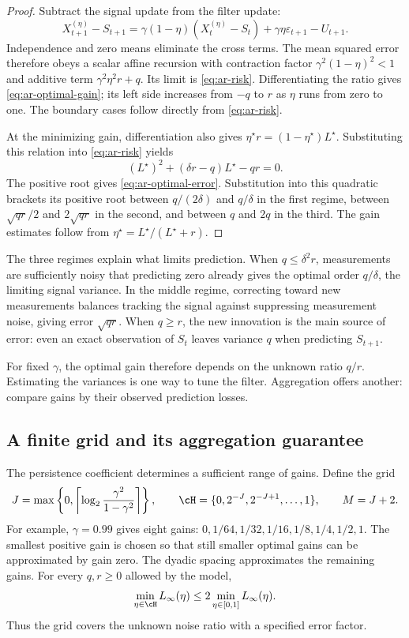 \documentclass[11pt,twoside]{article}
\theoremstyle{definition}
\theoremstyle{remark}
\begin{document}
\begin{proof}
Subtract the signal update from the filter update:
\[
 X_{t+1}^{(\eta)}-S_{t+1}
 =\gamma(1-\eta)(X_t^{(\eta)}-S_t)
   +\gamma\eta\varepsilon_{t+1}-U_{t+1}.
\]
Independence and zero means eliminate the cross terms. The mean squared
error therefore obeys a scalar affine recursion with contraction factor
$\gamma^2(1-\eta)^2<1$ and additive term $\gamma^2\eta^2r+q$.
Its limit is \cref{eq:ar-risk}. Differentiating the ratio gives
\cref{eq:ar-optimal-gain}; its left side increases from $-q$ to $r$
as $\eta$ runs from zero to one. The boundary cases follow directly
from \cref{eq:ar-risk}.

At the minimizing gain, differentiation also gives
$\eta^\star r=(1-\eta^\star)L^\star$. Substituting this relation into
\cref{eq:ar-risk} yields
\[
 (L^\star)^2+(\delta r-q)L^\star-qr=0.
\]
The positive root gives \cref{eq:ar-optimal-error}. Substitution into this
quadratic brackets its positive root between $q/(2\delta)$ and
$q/\delta$ in the first regime, between $\sqrt{qr}/2$ and
$2\sqrt{qr}$ in the second, and between $q$ and $2q$ in the third.
The gain estimates follow from $\eta^\star=L^\star/(L^\star+r)$.
\end{proof}

The three regimes explain what limits prediction. When
$q\le\delta^2r$, measurements are sufficiently noisy that predicting zero
already gives the optimal order $q/\delta$, the limiting signal variance.
In the middle regime, correcting toward new measurements balances tracking
the signal against suppressing measurement noise, giving error
$\sqrt{qr}$. When $q\ge r$, the new innovation is the main source of error:
even an exact observation of $S_t$ leaves variance $q$ when predicting
$S_{t+1}$.

For fixed $\gamma$, the optimal gain therefore depends on the unknown
ratio $q/r$. Estimating the variances is one way to tune the filter.
Aggregation offers another: compare gains by their observed prediction
losses.

\subsection{A finite grid and its aggregation guarantee}

The persistence coefficient determines a sufficient range of gains.
Define the grid
\begin{equation}
 J=\max\left\{0,\left\lceil\log_2\frac{\gamma^2}{1-\gamma^2}
                         \right\rceil\right\},\qquad
 \cH=\{0,2^{-J},2^{-J+1},\ldots,1\},\qquad M=J+2.
 \label{eq:gain-grid}
\end{equation}
For example, $\gamma=0.99$ gives eight gains:
$0,1/64,1/32,1/16,1/8,1/4,1/2,1$.
The smallest positive gain is chosen so that still smaller optimal gains
can be approximated by gain zero. The dyadic spacing approximates the
remaining gains. For every $q,r\ge0$ allowed by the model,
\begin{equation}
 \min_{\eta\in\cH}L_\infty(\eta)
 \le2\min_{\eta\in[0,1]}L_\infty(\eta).
 \label{eq:gain-grid-comparison}
\end{equation}
Thus the grid covers the unknown noise ratio with a specified error factor.
\end{document}
